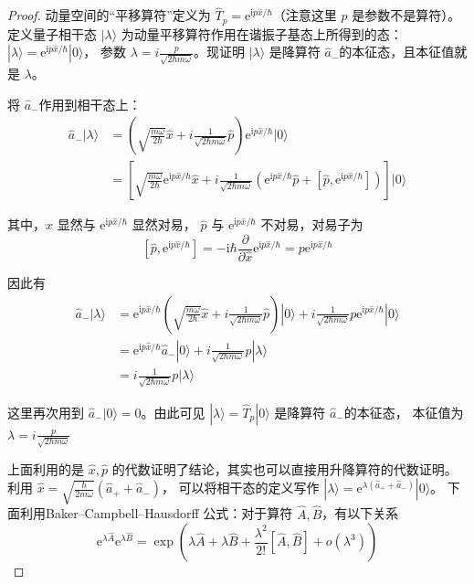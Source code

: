 \begin{proof}
    动量空间的``平移算符''定义为 $\hat{T}_{p}=\mathrm{e}^{\mathrm{i} p \hat{x} / \hbar}$（注意这里 $p$ 是参数不是算符）。
    定义量子相干态 $|\lambda\rangle$ 为动量平移算符作用在谐振子基态上所得到的态：$|\lambda\rangle=\mathrm{e}^{\mathrm{i} p \hat{x} / \hbar}|0\rangle$，
    参数 $\lambda=i \frac{p}{\sqrt{2 \hbar m \omega}}$。现证明 $|\lambda\rangle$ 是降算符 $\hat{a}_{-}$的本征态，且本征值就是 $\lambda$。

将 $\hat{a}_{-}$作用到相干态上：
$$
\begin{aligned}
\hat{a}_{-}|\lambda\rangle & =\left(\sqrt{\frac{m \omega}{2 \hbar}} \hat{x}+i \frac{1}{\sqrt{2 \hbar m \omega}} \hat{p}\right) \mathrm{e}^{\mathrm{i} p \hat{x} / \hbar}|0\rangle \\
& =\left[\sqrt{\frac{m \omega}{2 \hbar}} \mathrm{e}^{\mathrm{i} p \hat{x} / \hbar} \hat{x}+i \frac{1}{\sqrt{2 \hbar m \omega}}\left(\mathrm{e}^{\mathrm{i} p \hat{x} / \hbar} \hat{p}+\left[\hat{p}, \mathrm{e}^{\mathrm{i} p \hat{x} / \hbar}\right]\right)\right]|0\rangle
\end{aligned}
$$

其中，$\hat{x}$ 显然与 $\mathrm{e}^{\mathrm{i} p \hat{x} / \hbar}$ 显然对易，
$\hat{p}$ 与 $\mathrm{e}^{\mathrm{i} p \hat{x} / \hbar}$ 不对易，对易子为
$$\left[\hat{p}, \mathrm{e}^{\mathrm{i} p \hat{x} / \hbar}\right]
=-\mathrm{i} \hbar \frac{\partial}{\partial \hat{x}} \mathrm{e}^{\mathrm{i} p \hat{x} / \hbar}
=p \mathrm{e}^{\mathrm{i} p \hat{x} / \hbar}$$

因此有
$$
\begin{aligned}
\hat{a}_{-}|\lambda\rangle & =\mathrm{e}^{\mathrm{i} p \hat{x} / \hbar}\left(\sqrt{\frac{m \omega}{2 \hbar}} \hat{x}+i \frac{1}{\sqrt{2 \hbar m \omega}} \hat{p}\right)|0\rangle+i \frac{1}{\sqrt{2 \hbar m \omega}} p \mathrm{e}^{\mathrm{i} p \hat{x} / \hbar}|0\rangle \\
& =\mathrm{e}^{\mathrm{i} p \hat{x} / \hbar} \hat{a}_{-}|0\rangle+i \frac{1}{\sqrt{2 \hbar m \omega}} p|\lambda\rangle \\
& =i \frac{1}{\sqrt{2 \hbar m \omega}} p|\lambda\rangle
\end{aligned}
$$

这里再次用到 $\hat{a}_{-}|0\rangle=0$。由此可见 $|\lambda\rangle=\hat{T}_{p}|0\rangle$ 是降算符 $\hat{a}_{-}$的本征态，
本征值为 $\lambda=i \frac{p}{\sqrt{2 \hbar m \omega}}$

上面利用的是 $\hat{x},\hat{p}$ 的代数证明了结论，其实也可以直接用升降算符的代数证明。
利用 $\hat{x}=\sqrt{\frac{\hbar}{2 m \omega}}\left(\hat{a}_{+}+\hat{a}_{-}\right)$，
可以将相干态的定义写作 $|\lambda\rangle=\mathrm{e}^{\lambda\left(\hat{a}_{+}+\hat{a}_{-}\right)}|0\rangle$。
下面利用Baker--Campbell--Hausdorff 公式：对于算符 $\hat{A}, \hat{B}$，有以下关系
$$\mathrm{e}^{\lambda \hat{A}} \mathrm{e}^{\lambda \hat{B}}
=\exp \left(\lambda \hat{A}+\lambda \hat{B}+\frac{\lambda^{2}}{2!}[\hat{A}, \hat{B}]+o(\lambda^{3})\right)$$


\end{proof}
